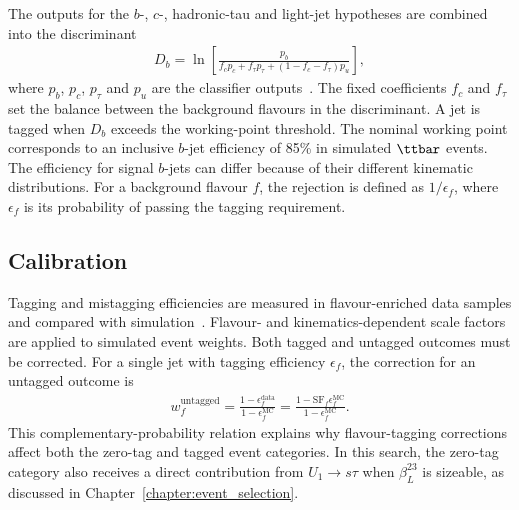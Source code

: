 The outputs for the $b$-, $c$-, hadronic-tau and light-jet hypotheses are combined into the discriminant
\begin{align}
    D_b=\ln\!\left[
    \frac{p_b}{f_c p_c+f_\tau p_\tau+(1-f_c-f_\tau)p_u}
    \right],
    \label{eq:ch6_gn2_discriminant}
\end{align}
where $p_b$, $p_c$, $p_\tau$ and $p_u$ are the classifier outputs~\cite{ATLAS2026GN2}.
The fixed coefficients $f_c$ and $f_\tau$ set the balance between the background flavours in the discriminant.
A jet is tagged when $D_b$ exceeds the working-point threshold.
The nominal working point corresponds to an inclusive $b$-jet efficiency of 85\% in simulated $\ttbar$ events.
The efficiency for signal $b$-jets can differ because of their different kinematic distributions.
For a background flavour $f$, the rejection is defined as $1/\epsilon_f$, where $\epsilon_f$ is its probability of passing the tagging requirement.

\subsection{Calibration}

Tagging and mistagging efficiencies are measured in flavour-enriched data samples and compared with simulation~\cite{ATLAS2026GN2}.
Flavour- and kinematics-dependent scale factors are applied to simulated event weights.
Both tagged and untagged outcomes must be corrected.
For a single jet with tagging efficiency $\epsilon_f$, the correction for an untagged outcome is
\begin{align}
    w_f^{\mathrm{untagged}}
    =\frac{1-\epsilon_f^{\mathrm{data}}}{1-\epsilon_f^{\mathrm{MC}}}
    =\frac{1-\mathrm{SF}_f\epsilon_f^{\mathrm{MC}}}{1-\epsilon_f^{\mathrm{MC}}}.
    \label{eq:ch6_btag_untagged}
\end{align}
This complementary-probability relation explains why flavour-tagging corrections affect both the zero-tag and tagged event categories.
In this search, the zero-tag category also receives a direct contribution from $U_1\rightarrow s\tau$ when $\beta_L^{23}$ is sizeable, as discussed in Chapter~\ref{chapter:event_selection}.
